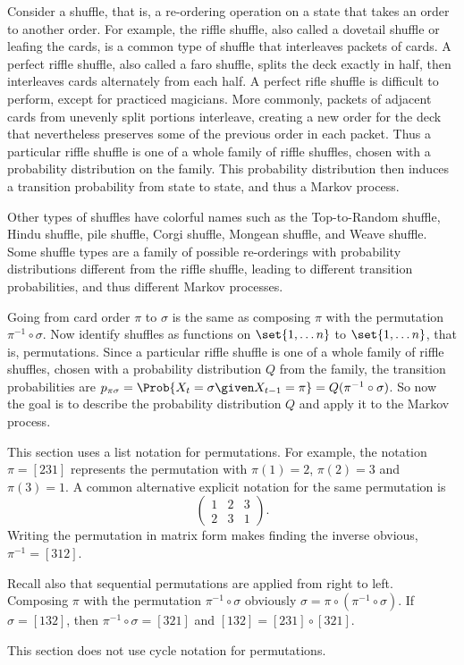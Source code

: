 \documentclass[12pt]{article}
\begin{document}
Consider a shuffle, that is, a re-ordering operation on a state that
takes an order to another order.  For example, the riffle shuffle, also
called a dovetail shuffle or leafing the cards, is a common type of
shuffle that interleaves packets of cards.  A perfect riffle shuffle,
also called a faro shuffle, splits the deck exactly in half, then
interleaves cards alternately from each half.  A perfect rifle shuffle is
difficult to perform, except for practiced magicians.  More commonly,
packets of adjacent cards from unevenly split portions interleave,
creating a new order for the deck that nevertheless preserves some of
the previous order in each packet.  Thus a particular riffle shuffle is
one of a whole family of riffle shuffles, chosen with a probability
distribution on the family.  This probability distribution then induces
a transition probability from state to state, and thus a Markov process.

Other types of shuffles have colorful names such as the Top-to-Random
shuffle, Hindu shuffle, pile shuffle, Corgi shuffle, Mongean shuffle,
and Weave shuffle. Some shuffle types are a family of possible
re-orderings with probability distributions different from the riffle
shuffle, leading to different transition probabilities, and thus
different Markov processes.

Going from card order \( \pi \) to \( \sigma \) is the same as composing \(
\pi \) with the permutation \( \pi^{-1} \circ \sigma \).  Now identify
shuffles as functions on \( \set{1, \dots n} \) to \( \set{1, \dots n} \),
that is, permutations.%
Since a particular riffle shuffle is one of a whole family of riffle
shuffles, chosen with a probability distribution \( Q \) from the
family, the transition probabilities are \( p_{\pi \sigma} = \Prob{X_t =
\sigma \given X_{t-1} = \pi} = Q(\pi^{-1} \circ \sigma) \).  So now the goal
is to describe the probability distribution \( Q \) and apply it to the
Markov process.

\begin{remark}
    This section uses a list notation for permutations.  For example,
    the notation \( \pi = [231] \) represents the permutation with \(
    \pi(1) = 2 \), \( \pi(2) = 3 \) and \( \pi(3) = 1 \).  A common
    alternative explicit notation for the same permutation is
    \[
        \begin{pmatrix}
            1 & 2 & 3 \\
            2 & 3 & 1
        \end{pmatrix}
        .
    \] Writing the permutation in matrix form makes finding the inverse
    obvious, \( \pi^{-1} = [312] \).

    Recall also that sequential permutations are applied from right to
    left.  Composing \( \pi \) with the permutation \( \pi^{-1} \circ
    \sigma \) obviously \( \sigma = \pi \circ (\pi^{-1} \circ \sigma) \). If \(
    \sigma = [132] \), then \( \pi^{-1} \circ \sigma = [321] \) and \( [132]
    = [231] \circ [321] \).

    This section does not use cycle notation for permutations.
\end{remark}
\end{document}
